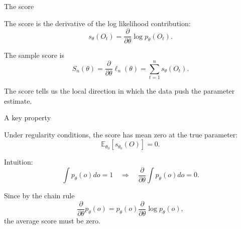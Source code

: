 \documentclass[xcolor={table}, handout]{beamer}
\begin{document}
\note{
\scriptsize \singlespacing

}
\begin{frame}{The score}

\begin{wideitemize}
\item The score is the derivative of the log likelihood contribution:
\[
s_\theta(O_t)
  =
  \frac{\partial}{\partial \theta}\log p_\theta(O_t).
\]\pause
\item The sample score is
\[
S_n(\theta)
  =
  \frac{\partial}{\partial \theta}\ell_n(\theta)
  =
  \sum_{t=1}^n s_\theta(O_t).
\]\pause
\item The score tells us the local direction in which the data push the parameter estimate.
\end{wideitemize}

\end{frame}

\note{
\scriptsize \singlespacing

}
\begin{frame}{A key property}

\begin{wideitemize}
\item Under regularity conditions, the score has mean zero at the true parameter:
\[
\mathbb{E}_{\theta_0}[s_{\theta_0}(O)]=0.
\]\pause
\item Intuition:
\[
\int p_\theta(o)d o = 1
\quad \Rightarrow \quad
\frac{\partial}{\partial \theta}\int p_\theta(o)d o = 0.
\]\pause
\item Since by the chain rule
\[
\frac{\partial}{\partial \theta}p_\theta(o)
  =
  p_\theta(o)\frac{\partial}{\partial \theta}\log p_\theta(o),
\]
the average score must be zero.
\end{wideitemize}

\end{frame}
\end{document}
